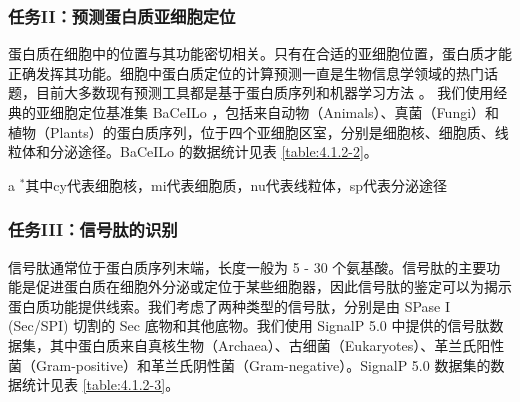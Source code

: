 \subsubsection{任务II：预测蛋白质亚细胞定位}

蛋白质在细胞中的位置与其功能密切相关。只有在合适的亚细胞位置，蛋白质才能正确发挥其功能。细胞中蛋白质定位的计算预测一直是生物信息学领域的热门话题，目前大多数现有预测工具都是基于蛋白质序列和机器学习方法 \cite{cheng2018ploc, nair2005mimicking, 2010YLoc}。 我们使用经典的亚细胞定位基准集 BaCeILo \cite{pierleoni2006bacello}，包括来自动物（Animals）、真菌（Fungi）和植物（Plants）的蛋白质序列，位于四个亚细胞区室，分别是细胞核、细胞质、线粒体和分泌途径。BaCeILo 的数据统计见表 \ref{table:4.1.2-2}。

\begin{table}[!htbp]
\centering
{}
\begin{tablenotes}\scriptsize
\item [a] $^*$其中cy代表细胞核，mi代表细胞质，nu代表线粒体，sp代表分泌途径\\
\end{tablenotes}
 \label{table:4.1.2-2}
\end{table}

\subsubsection{任务III：信号肽的识别}
信号肽通常位于蛋白质序列末端，长度一般为 5 - 30 个氨基酸。信号肽的主要功能是促进蛋白质在细胞外分泌或定位于某些细胞器，因此信号肽的鉴定可以为揭示蛋白质功能提供线索。我们考虑了两种类型的信号肽，分别是由 SPase I (Sec/SPI) 切割的 Sec 底物和其他底物。我们使用 SignalP 5.0 \cite{armenteros2019signalp} 中提供的信号肽数据集，其中蛋白质来自真核生物（Archaea）、古细菌（Eukaryotes）、革兰氏阳性菌（Gram-positive）和革兰氏阴性菌（Gram-negative）。SignalP 5.0 数据集的数据统计见表 \ref{table:4.1.2-3}。

